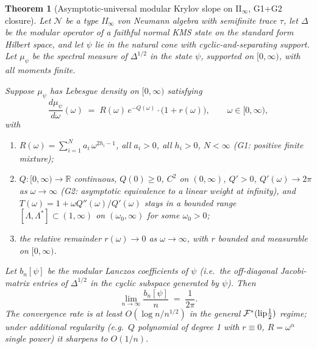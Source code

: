 \documentclass[11pt]{article}
\newtheorem{theorem}{Theorem}
\theoremstyle{definition}
\newcommand{\R}{\mathbb{R}}
\newcommand{\Alg}{\mathcal{N}}
\newcommand{\modop}{\Delta}
\newcommand{\modhalf}{\modop^{1/2}}
\begin{document}
\begin{theorem}[Asymptotic-universal modular Krylov slope on II$_\infty$,
G1+G2 closure]
\label{thm:main}
Let $\Alg$ be a type II$_\infty$ von Neumann algebra with semifinite
trace $\tau$, let $\modop$ be the modular operator of a faithful normal
KMS state on the standard form Hilbert space, and let $\psi$ lie in the
natural cone with cyclic-and-separating support.  Let $\mu_\psi$ be the
spectral measure of $\modhalf$ in the state $\psi$, supported on
$[0,\infty)$, with all moments finite.

Suppose $\mu_\psi$ has Lebesgue density on $[0,\infty)$ satisfying
\begin{equation}\label{eq:hypG1G2}
\frac{d\mu_\psi}{d\omega}(\omega) \;=\; R(\omega)\,e^{-Q(\omega)}\cdot\bigl(1+r(\omega)\bigr),
\qquad \omega\in[0,\infty),
\end{equation}
with
\begin{enumerate}[label=(\roman*)]
\item $R(\omega)=\sum_{i=1}^{N} a_i\,\omega^{2h_i-1}$, all $a_i>0$, all $h_i>0$,
   $N<\infty$ (G1: positive finite mixture);
\item $Q\colon[0,\infty)\to\R$ continuous, $Q(0)\ge 0$, $C^2$ on $(0,\infty)$,
   $Q'>0$, $Q'(\omega)\to 2\pi$ as $\omega\to\infty$ (G2: asymptotic
   equivalence to a linear weight at infinity), and
   $T(\omega)=1+\omega Q''(\omega)/Q'(\omega)$ stays in a bounded range
   $[\Lambda,\Lambda^*]\subset(1,\infty)$ on $(\omega_0,\infty)$ for some
   $\omega_0>0$;
\item the relative remainder $r(\omega)\to 0$ as $\omega\to\infty$, with
   $r$ bounded and measurable on $[0,\infty)$.
\end{enumerate}
Let $b_n[\psi]$ be the modular Lanczos coefficients of $\psi$ (i.e.\ the
off-diagonal Jacobi-matrix entries of $\modhalf$ in the cyclic subspace
generated by $\psi$).  Then
\begin{equation}\label{eq:mainresult}
   \boxed{\;\lim_{n\to\infty}\frac{b_n[\psi]}{n}\;=\;\frac{1}{2\pi}.\;}
\end{equation}
The convergence rate is at least $O(\log n / n^{1/2})$ in the general
$\mathcal{F}^*(\textnormal{lip}\frac{1}{2})$ regime; under additional
regularity (e.g.\ $Q$ polynomial of degree 1 with $r\equiv 0$, $R=\omega^\alpha$
single power) it sharpens to $O(1/n)$.
\end{theorem}
\end{document}
